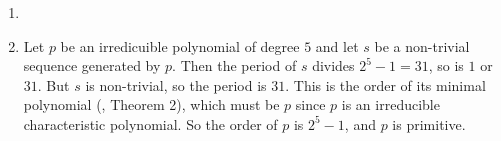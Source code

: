 \begin{enumerate}

\item

\item Let $p$ be an irredicuible polynomial of degree $5$ and let $s$ be a non-trivial
sequence generated by $p$. Then the period of $s$ divides $2^5-1=31$, so is $1$ or $31$.
But $s$ is non-trivial, so the period is $31$. This is the order of its minimal polynomial
(\cite{slides}, Theorem 2), which must be $p$ since $p$ is an irreducible characteristic
polynomial. So the order of $p$ is $2^5-1$, and $p$ is primitive.

\end{enumerate}
